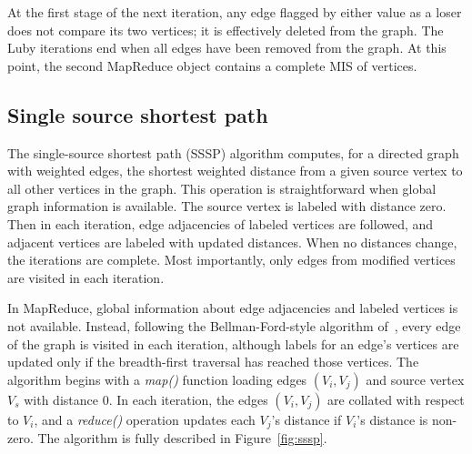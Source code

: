 At the first stage of the next iteration, any edge flagged by either
value as a loser does not compare its two vertices; it is effectively
deleted from the graph.  The Luby iterations end when all edges have
been removed from the graph.  At this point, the second MapReduce
object contains a complete MIS of vertices.

\subsection{Single source shortest path}

The single-source shortest path (SSSP) algorithm computes, for a directed graph
with weighted edges,
the shortest weighted distance from a given source vertex to
all other vertices in the graph.  This operation is straightforward
when global graph information is available.  The source vertex is labeled with
distance zero.  Then in each iteration, edge adjacencies of labeled vertices
are followed, and adjacent vertices are labeled with updated distances.  When
no distances change, the iterations are complete.  Most importantly, only
edges from modified vertices are visited in each iteration.

In MapReduce, global information about edge adjacencies and labeled vertices
is not available.  Instead, following the Bellman-Ford-style 
algorithm of~\cite{SSSPMapReduce, Bellman58, Ford62},
every edge of the graph is visited in each iteration,
although labels for an edge's vertices are updated only if the breadth-first
traversal has reached those vertices.  The algorithm begins with a {\it map()}
function loading edges $(V_i, V_j)$ and source vertex $V_s$ with distance 0.
In each iteration, the edges $(V_i, V_j)$ are collated with respect to
$V_i$, and a {\it reduce()} operation updates each $V_j$'s distance if
$V_i$'s distance is non-zero.  The algorithm is fully described in
Figure~\ref{fig:sssp}.


